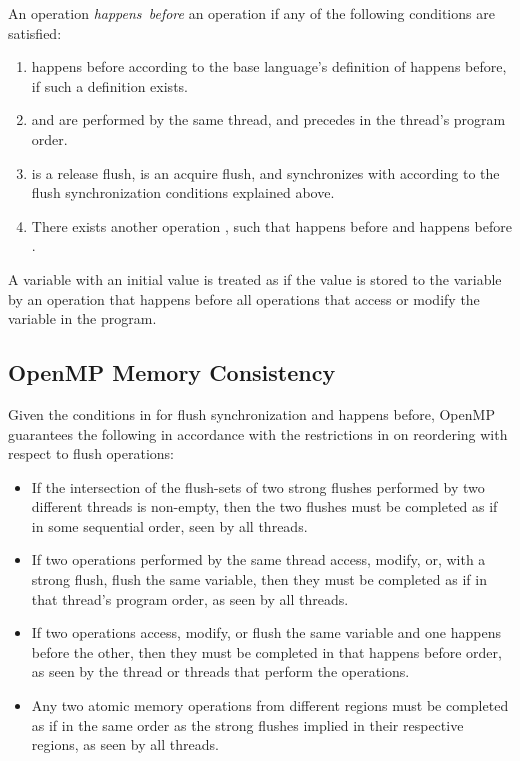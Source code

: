 An operation  \emph{happens~before} an operation  if any of the following conditions are satisfied:
\begin{enumerate}
\item {} happens before  according to the base language's definition of happens before, if such a definition exists.
\item {} and  are performed by the same thread, and  precedes  in the thread's program order.
\item {} is a release flush,  is an acquire flush, and  synchronizes with  according to the flush synchronization
conditions explained above.
\item There exists another operation , such that  happens before  and  happens before .
\end{enumerate}

A variable with an initial value is treated as if the value is stored to the
variable by an operation that happens before all operations that access or
modify the variable in the program.

\subsection{OpenMP Memory Consistency}
\label{subsec:OpenMP Memory Consistency}
Given the conditions in  for flush
synchronization and happens before, OpenMP guarantees the following in
accordance with the restrictions in  on
reordering with respect to flush operations:

\begin{itemize}
\item If the intersection of the flush-sets of two strong flushes
    performed by two different threads is non-empty, then the two flushes must
    be completed as if in some sequential order, seen by all threads.

\item If two operations performed by the same thread access, modify, or, with
    a strong flush, flush the same variable, then they must be
    completed as if in that thread's program order, as seen by all threads. 

\item If two operations access, modify, or flush the same variable and one
    happens before the other, then they must be completed in that happens
    before order, as seen by the thread or threads that perform the
    operations.

\item Any two atomic memory operations from different  regions
    must be completed as if in the same order as the strong flushes
    implied in their respective regions, as seen by all threads.
    \end{itemize}

